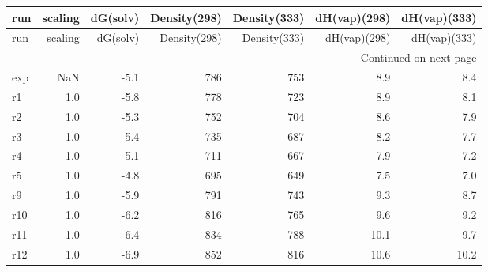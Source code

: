 \begin{longtable}{lrrrrrr}
\toprule
run &  scaling &  dG(solv) &  Density(298) &  Density(333) &  dH(vap)(298) &  dH(vap)(333) \\
\midrule
\endfirsthead

\toprule
run &  scaling &  dG(solv) &  Density(298) &  Density(333) &  dH(vap)(298) &  dH(vap)(333) \\
\midrule
\endhead
\midrule
\multicolumn{7}{r}{{Continued on next page}} \\
\midrule
\endfoot

\bottomrule
\endlastfoot
exp &      NaN &      -5.1 &           786 &           753 &           8.9 &           8.4 \\
 r1 &      1.0 &      -5.8 &           778 &           723 &           8.9 &           8.1 \\
 r2 &      1.0 &      -5.3 &           752 &           704 &           8.6 &           7.9 \\
 r3 &      1.0 &      -5.4 &           735 &           687 &           8.2 &           7.7 \\
 r4 &      1.0 &      -5.1 &           711 &           667 &           7.9 &           7.2 \\
 r5 &      1.0 &      -4.8 &           695 &           649 &           7.5 &           7.0 \\
 r9 &      1.0 &      -5.9 &           791 &           743 &           9.3 &           8.7 \\
r10 &      1.0 &      -6.2 &           816 &           765 &           9.6 &           9.2 \\
r11 &      1.0 &      -6.4 &           834 &           788 &          10.1 &           9.7 \\
r12 &      1.0 &      -6.9 &           852 &           816 &          10.6 &          10.2 \\
\end{longtable}
